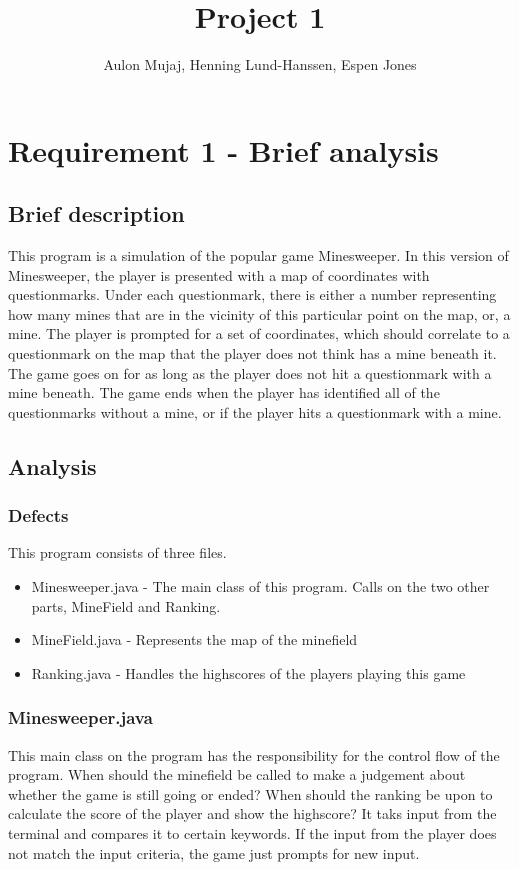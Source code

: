 \documentclass[UKenglish]{article}  %
\title{Project 1}        %
\author{Aulon Mujaj, Henning Lund-Hanssen, Espen Jones}                      %
\begin{document}
\maketitle{}

\section{Requirement 1 - Brief analysis}

\subsection{Brief description}
This program is a simulation of the popular game Minesweeper. In this version of
Minesweeper, the player is presented with a map of coordinates with
questionmarks. Under each questionmark, there is either a number representing
how many mines that are in the vicinity of this particular point on the map, or,
a mine. The player is prompted for a set of coordinates, which should correlate
to a questionmark on the map that the player does not think has a mine beneath
it. The game goes on for as long as the player does not hit a questionmark with
a mine beneath. The game ends when the player has identified all of the
questionmarks without a mine, or if the player hits a questionmark with a mine.
\subsection{Analysis}
\subsubsection{Defects}
This program consists of three files.

\begin{itemize}
    \item Minesweeper.java - The main class of this program. Calls on the two
        other parts, MineField and Ranking.
    \item MineField.java - Represents the map of the minefield
    \item Ranking.java - Handles the highscores of the players playing this game
\end{itemize}
\subsubsection{Minesweeper.java}
This main class on the program has the responsibility for the control flow of
the program. When should the minefield be called to make a judgement about
whether the game is still going or ended? When should the ranking be upon to
calculate the score of the player and show the highscore? It taks input from the
terminal and compares it to certain keywords. If the input from the player does
not match the input criteria, the game just prompts for new input.
\end{document}
